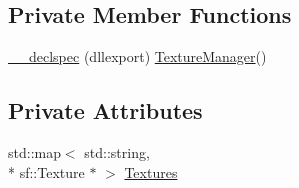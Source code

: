 \subsection*{Private Member Functions}
\begin{DoxyCompactItemize}
\item 
\hyperlink{class_texture_manager_a810093a8d9e11bbf4ac3b5b61290679f}{\-\_\-\-\_\-declspec} (dllexport) \hyperlink{class_texture_manager}{Texture\-Manager}()
\end{DoxyCompactItemize}
\subsection*{Private Attributes}
\begin{DoxyCompactItemize}
\item 
std\-::map$<$ std\-::string, \\*
sf\-::\-Texture $\ast$ $>$ \hyperlink{class_texture_manager_a7b3ea39ee8017ce3a7b5826bab1d2e04}{Textures}
\end{DoxyCompactItemize}


